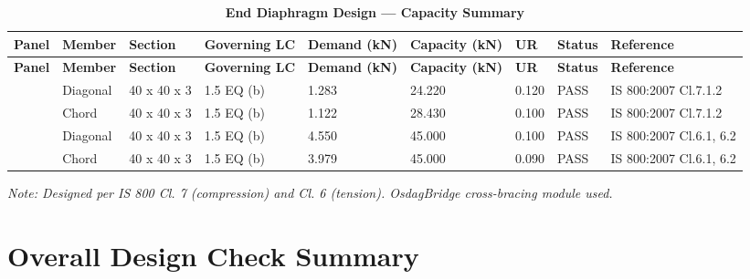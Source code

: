 \documentclass[12pt,a4paper]{report}
\numberwithin{table}{chapter}
\numberwithin{figure}{chapter}
\begin{document}
\vspace{1em}

\begin{longtable}{|C{1.3cm}|L{1.5cm}|C{1.5cm}|C{2.0cm}|C{1.6cm}|C{1.9cm}|C{1.0cm}|C{1.3cm}|C{2.0cm}|}
\caption{\textbf{End Diaphragm Design --- Capacity Summary}}
\hline
{\footnotesize\textbf{Panel}} & {\footnotesize\textbf{Member}} & {\footnotesize\textbf{Section}} & {\footnotesize\textbf{Governing LC}} & {\footnotesize\textbf{Demand (kN)}} & {\footnotesize\textbf{Capacity (kN)}} & {\footnotesize\textbf{UR}} & {\footnotesize\textbf{Status}} & {\footnotesize\textbf{Reference}} \\[6pt]
\hline
\endfirsthead

\hline
{\footnotesize\textbf{Panel}} & {\footnotesize\textbf{Member}} & {\footnotesize\textbf{Section}} & {\footnotesize\textbf{Governing LC}} & {\footnotesize\textbf{Demand (kN)}} & {\footnotesize\textbf{Capacity (kN)}} & {\footnotesize\textbf{UR}} & {\footnotesize\textbf{Status}} & {\footnotesize\textbf{Reference}} \\[6pt]
\hline
\endhead
{} & Diagonal & 40 x 40 x 3 & 1.5 EQ (b) & 1.283 & 24.220 & 0.120 & PASS & IS 800:2007 Cl.7.1.2 \\[6pt]
 & Chord & 40 x 40 x 3 & 1.5 EQ (b) & 1.122 & 28.430 & 0.100 & PASS & IS 800:2007 Cl.7.1.2 \\[6pt]
\hline
{} & Diagonal & 40 x 40 x 3 & 1.5 EQ (b) & 4.550 & 45.000 & 0.100 & PASS & IS 800:2007 Cl.6.1, 6.2 \\[6pt]
 & Chord & 40 x 40 x 3 & 1.5 EQ (b) & 3.979 & 45.000 & 0.090 & PASS & IS 800:2007 Cl.6.1, 6.2 \\[6pt]
\hline
\end{longtable}
\noindent\textit{Note: Designed per IS 800 Cl. 7 (compression) and Cl. 6 (tension). OsdagBridge cross-bracing module used.}

\section{Overall Design Check Summary}
\label{sec:overall-summary}
\end{document}
